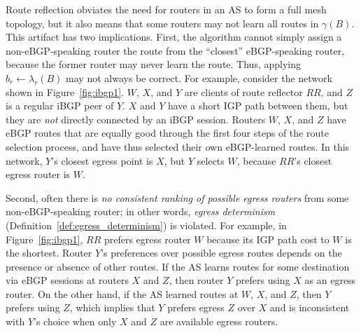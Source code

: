 Route reflection obviates the need for routers in an AS to form a full
mesh topology, but it also means that some routers may not learn all
routes in $\gamma(B)$.  This artifact has two implications.  First, the
algorithm cannot simply assign a non-eBGP-speaking router the route from
the ``closest'' eBGP-speaking router, because the former router may
never learn the route.
Thus, applying $b_r \leftarrow \lambda_r(B)$ may not always be
correct. 
%
For example, consider the network shown in Figure~\ref{fig:ibgp1}.  $W$,
$X$, and $Y$ are clients of route reflector $RR$, and $Z$ is a regular
iBGP peer of $Y$.  $X$ and $Y$ have a short IGP path between them, but
they are {\em not} directly connected by an iBGP session.  Routers $W$,
$X$, and $Z$ have eBGP routes that are equally good through the first
four steps of the route selection process, and have thus selected their own
eBGP-learned routes.  In this network, $Y$'s closest egress point is
$X$, but $Y$ selects $W$, because $RR$'s closest egress router is $W$.
%

Second, often there is {\em no consistent ranking of possible egress
  routers} from some non-eBGP-speaking router; in other words, {\em
  egress determinism} (Definition~\ref{def:egress_determinism}) is
  violated. 
%
For example, in Figure~\ref{fig:ibgp1}, 
$RR$ prefers egress router $W$
because its IGP path 
cost to $W$ is the shortest.  Router $Y$'s preferences over possible egress
routes depends on the presence or absence of other routes.  If the AS
learns routes for some destination via eBGP sessions at routers $X$ and
$Z$, then router $Y$ prefers using $X$ as an egress router.  On the
other hand, if the AS learned routes at $W$, $X$, and $Z$, then $Y$
prefers using $Z$, which implies that $Y$ prefers egress $Z$ over $X$
and is inconsistent with $Y$'s choice when only $X$ and $Z$ are
available egress routers.

